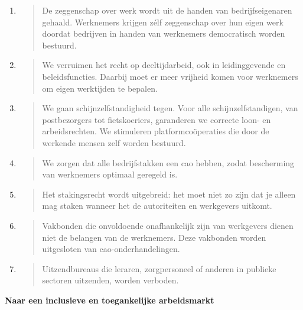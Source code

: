 \begin{enumerate}
\def\labelenumi{\arabic{enumi}.}
\item
  \begin{quote}
  De zeggenschap over werk wordt uit de handen van bedrijfseigenaren
  gehaald. Werknemers krijgen zélf zeggenschap over hun eigen werk
  doordat bedrijven in handen van werknemers democratisch worden
  bestuurd.
  \end{quote}
\item
  \begin{quote}
  We verruimen het recht op deeltijdarbeid, ook in leidinggevende en
  beleidsfuncties. Daarbij moet er meer vrijheid komen voor werknemers
  om eigen werktijden te bepalen.
  \end{quote}
\item
  \begin{quote}
  We gaan schijnzelfstandigheid tegen. Voor alle schijnzelfstandigen,
  van postbezorgers tot fietskoeriers, garanderen we correcte loon- en
  arbeidsrechten. We stimuleren platformcoöperaties die door de werkende
  mensen zelf worden bestuurd.
  \end{quote}
\item
  \begin{quote}
  We zorgen dat alle bedrijfstakken een cao hebben, zodat bescherming
  van werknemers optimaal geregeld is.
  \end{quote}
\item
  \begin{quote}
  Het stakingsrecht wordt uitgebreid: het moet niet zo zijn dat je
  alleen mag staken wanneer het de autoriteiten en werkgevers uitkomt.
  \end{quote}
\item
  \begin{quote}
  Vakbonden die onvoldoende onafhankelijk zijn van werkgevers dienen
  niet de belangen van de werknemers. Deze vakbonden worden uitgesloten
  van cao-onderhandelingen.
  \end{quote}
\item
  \begin{quote}
  Uitzendbureaus die leraren, zorgpersoneel of anderen in publieke
  sectoren uitzenden, worden verboden.
  \end{quote}
\end{enumerate}

\textbf{Naar een inclusieve en toegankelijke arbeidsmarkt}

